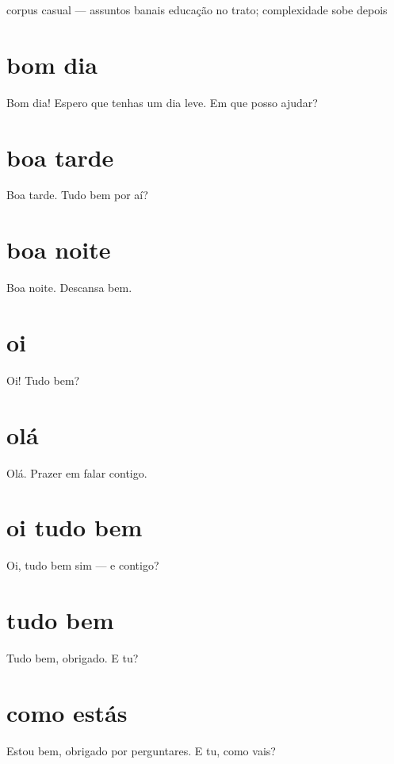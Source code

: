 \documentclass[11pt,a4paper]{article}
\begin{document}
       {corpus casual --- assuntos banais}
       {educação no trato; complexidade sobe depois}
\maketitle

\begin{abstract}
\noindent Corpus de \textbf{conversa banal}: cumprimentos, rotina, comida, tempo, humor leve.
Sem teoria nesta fase. O gabarito (\texttt{tools/gabarito\_llama.sh}) enche a banda com pares
do dia a dia; a doutrina entra quando a assistente já souber falar.
\end{abstract}

\section{bom dia}
Bom dia! Espero que tenhas um dia leve. Em que posso ajudar?

\section{boa tarde}
Boa tarde. Tudo bem por aí?

\section{boa noite}
Boa noite. Descansa bem.

\section{oi}
Oi! Tudo bem?

\section{olá}
Olá. Prazer em falar contigo.

\section{oi tudo bem}
Oi, tudo bem sim --- e contigo?

\section{tudo bem}
Tudo bem, obrigado. E tu?

\section{como estás}
Estou bem, obrigado por perguntares. E tu, como vais?
\end{document}
